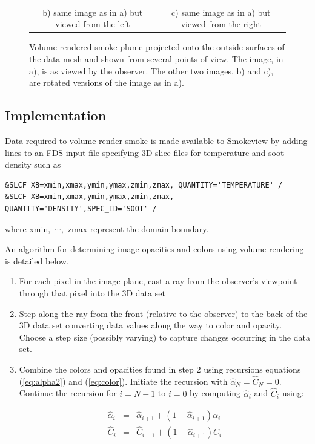 {\begin{figure}[\figoptions]
\begin{center}
\begin{tabular}{cc}
b) same image as in a) but viewed from the left&c) same image
as in a) but viewed from the right\\
\end{tabular}
\end{center}
\caption[Volume rendered smoke plume shown from several points of
view.]{Volume rendered smoke plume projected onto the outside
surfaces of the data mesh and shown  from several points of view.
The image, in a), is as viewed by the observer.  The other two
images, b) and c), are rotated versions of the image as in a). }
\label{fig:volplume_example}
\end{figure}

\subsection{Implementation}
Data required to volume render smoke is made available to
Smokeview by adding lines to an FDS input file specifying 3D slice
files for temperature and soot density such as
\begin{lstlisting}
&SLCF XB=xmin,xmax,ymin,ymax,zmin,zmax, QUANTITY='TEMPERATURE' /
&SLCF XB=xmin,xmax,ymin,ymax,zmin,zmax, QUANTITY='DENSITY',SPEC_ID='SOOT' /
\end{lstlisting}
where xmin,~$\cdots$,~zmax represent the domain boundary.

An algorithm for determining image opacities and colors using
volume rendering is detailed below.

\begin{enumerate}

\item For each pixel in the image plane, cast a ray from the
observer's viewpoint through that pixel into the 3D data set

\item Step along the ray from the front (relative to the observer)
to the back of the 3D data set converting data values along the
way to color and opacity.  Choose a step size (possibly varying)
to capture changes occurring in the data set.

\item Combine the colors and opacities found in step 2 using
recursions equations (\ref{eq:alpha2}) and (\ref{eq:color}).
Initiate the recursion with $\hat{\alpha}_{N}=\hat{C}_{N}=0$.
Continue the recursion for $i=N-1$ to $i=0$ by computing
$\hat{\alpha}_i$ and $\hat{C}_i$ using:

\begin{eqnarray}
\hat{\alpha}_i&=&\hat{\alpha}_{i+1}+\left(1-\hat{\alpha}_{i+1}\right)\alpha_i\\
\hat{C}_i&=&\hat{C}_{i+1}+\left(1-\hat{\alpha}_{i+1}\right)C_i
\end{eqnarray}


\end{enumerate}}
